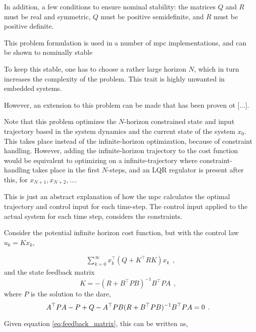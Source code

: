 In addition, a few conditions to ensure nominal stability: the matrices $Q$ and $R$ must be real and symmetric, $Q$ must be positive semidefinite, and $R$ must be positive definite.

This problem formulation is used in a number of \acrshort{mpc} implementations, and can be shown to nominally stable %

To keep this stable, one has to choose a rather large horizon $N$, which in turn increases the complexity of the problem. This trait is highly unwanted in embedded systems.


However, an extension to this problem can be made that has been proven ot [...]. 

Note that this problem optimizes the $N$-horizon constrained state and input trajectory based in the system dynamics and the current state of the system $x_0$. This takes place instead of the infinite-horizon optimization, because of constraint handling. However, adding the infinite-horizon trajectory to the cost function would be equivalent to optimizing on a infinite-trajectory where constraint-handling takes place in the first $N$-steps, and an LQR regulator is present after this, for $x_{N+1}, x_{N+2}, \hdots. $ 

This is just an abstract explanation of how the \acrshort{mpc} calculates the optimal trajectory and control input for each time-step. The control input applied to the actual system for each time step, considers the constraints.

Consider the potential infinite horizon cost function, but with the control law $u_k = Kx_{k}$,

\begin{equation}\label{eq:cost_inf_horizon}
    \begin{split}
        &\sum_{k=0}^{\infty} x_k^\top (Q + K^\top R K) x_k \: \: ,
    \end{split}
\end{equation}
and the state feedback matrix 
\begin{equation}\label{eq:feedback_matrix}
    K = -(R + B^\top P B)^{-1} B^\top P A \: \: ,
\end{equation}
where $P$ is the solution to the \acrfull{dare},
\begin{equation}\label{eq:DARE}
    A^\top P A - P + Q - A^\top PB(R + B^\top PB)^{-1}B^\top PA = 0 \: \: . \\
\end{equation}

Given equation \eqref{eq:feedback_matrix}, this can be written as,


